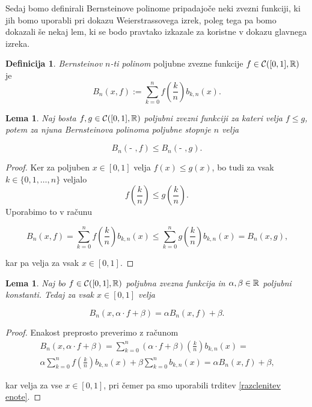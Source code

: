\documentclass[a4paper]{amsart}
\theoremstyle{theorem}
\newtheorem{lema}[izrek]{Lema}
\theoremstyle{definition}
\newtheorem{definicija}{Definicija}[section]
\begin{document}
Sedaj bomo definirali Bernsteinove polinome pripadajoče neki zvezni funkciji, 
ki jih bomo uporabli pri dokazu Weierstrassovega
izrek, poleg tega pa bomo dokazali še nekaj lem, ki se bodo pravtako izkazale za koristne
v dokazu glavnega izreka. 

\begin{definicija}
	\emph{Bernsteinov $n$-ti polinom} poljubne zvezne funkcije $f \in \mathcal{C}([0,1],\mathbb{R})$ je
	$$ B_n(x, f) := \sum_{k = 0}^n f\left(\frac kn\right)b_{k,n}(x)\text{.}$$

\end{definicija}

\begin{lema}
	Naj bosta $f, g \in \mathcal{C}([0,1],\mathbb{R})$ poljubni zvezni funkciji za kateri velja $f \leq g$, potem za
	njuna Bernsteinova polinoma poljubne stopnje $n$ velja

	$$ B_n(\text{- },f) \leq B_n(\text{- },g)\text{.}$$ 
\end{lema}

\begin{proof}
	Ker za poljuben $x \in [0,1]$ velja $f(x) \leq g(x)$, bo tudi za vsak $k \in \{0,1,\dots, n\}$
	veljalo
	$$ f\left(\frac kn\right) \leq g\left(\frac kn\right)\text{.}$$
	Uporabimo to v računu

	$$ B_n(x, f) = \sum_{k = 0}^n f\left(\frac kn\right)b_{k,n}(x) \leq 
	\sum_{k = 0}^n g\left(\frac kn\right)b_{k,n}(x) = B_n(x, g)\text{,}$$

	kar pa velja za vsak $x \in [0,1]$.
\end{proof}

\begin{lema}
	Naj bo $f \in \mathcal{C}([0,1],\mathbb{R})$ poljubna zvezna funkcija in $\alpha, \beta \in \mathbb{R}$ poljubni konstanti.
	Tedaj za vsak $x \in [0,1]$ velja 

	$$ B_n(x, \alpha \cdot f + \beta) = \alpha B_n(x, f) + \beta\text{.}$$
\end{lema}

\begin{proof}
	Enakost preprosto preverimo z računom
	\begin{multline*}
	B_n(x, \alpha \cdot f + \beta) = 
	\sum_{k = 0}^n (\alpha \cdot f + \beta)\left(\frac kn\right)b_{k,n}(x) =\\
	\alpha \sum_{k = 0}^n f\left(\frac kn\right)b_{k,n}(x) + \beta \sum_{k = 0}^n b_{k,n}(x) =
	\alpha B_n(x, f) + \beta\text{,}
\end{multline*}

kar velja za vse $x \in [0,1]$, pri čemer pa smo uporabili trditev \ref{razclenitev enote}.
\end{proof}
\end{document}
